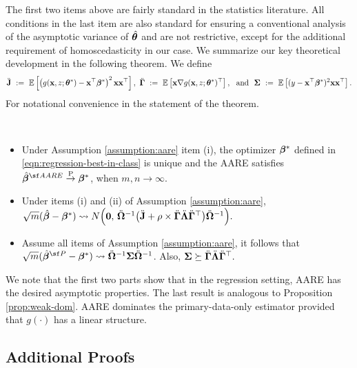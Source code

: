 {The first two items above are fairly standard in the statistics literature. All conditions in the last item are also standard for ensuring a conventional analysis of the asymptotic variance of $\hat{\bm{\theta}}$ and are not restrictive, except for the additional requirement of homoscedasticity in our case.
We summarize our key theoretical development in the following theorem. 
We define $$\ddot{\mathbf{J}} ~:=~ \mathbb{E}\left[ \left(g(\mathbf{x}, z; \bm{\theta}^*) - \mathbf{x}^{\top}\bm{\beta}^*\right)^2 \mathbf{x} \mathbf{x}^{\top} \right],~
\ddot{\mathbf{\Gamma}}~:=~ \mathbb{E}\left[ \mathbf{x}\nabla g(\mathbf{x}, z; \bm{\theta}^*)^{\top} \right]
,~\text{ and }~
\bm{\Sigma} ~:=~ \mathbb{E}
\left[
(y - \mathbf{x}^{\top}\bm{\beta}^*)^2 \mathbf{x}\mathbf{x}^{\top}
\right].
$$
For notational convenience in the statement of the theorem. 

\begin{thm}
\label{thm:aare}
~
\begin{itemize}
    \item [$(i)$] Under Assumption \ref{assumption:aare} item (i), the optimizer  
    $\bm{\beta}^*$ defined in \eqref{eqn:regression-best-in-class} is unique and the AARE satisfies 
    $\hat{\betavec}^{\sf AARE} \pconverge \betavec^*$, when $m,n\rightarrow \infty$.

    \item [$(ii)$] Under items (i) and (ii) of Assumption \ref{assumption:aare}, $
    \sqrt{m}(\hat{\bm{\beta}} - \bm{\beta}^*) \rightsquigarrow N\Big(\bm{0},\, \ddot{\bm{\Omega}}^{-1}\big(\ddot{\mathbf{J}} + \rho\times\ddot{\bm{\Gamma}}\ddot{\bm{\Lambda}}\ddot{\bm{\Gamma}}^{\top}\big)\ddot{\bm{\Omega}}^{-1}\Big).
    $

    \item [$(iii)$] Assume all items of Assumption \ref{assumption:aare}, it follows that $\sqrt{m}(\hat{\betavec}^{\sf P} - \betavec^*)\rightsquigarrow \ddot{\Omegavec}^{-1}\Sigmavec \ddot{\Omegavec}^{-1}$. Also, $\bm{\Sigma} \succeq \ddot{\bm{\Gamma}}\ddot{\bm{\Lambda}}\ddot{\bm{\Gamma}}^{\top}.$
\end{itemize}
\end{thm}

We note that the first two parts show that in the regression setting, AARE has the desired asymptotic properties. 
The last result is analogous to 
Proposition  \ref{prop:weak-dom}. 
AARE dominates the primary-data-only estimator provided that $g(\cdot)$ has a linear structure.} 

\subsection{Additional Proofs}

